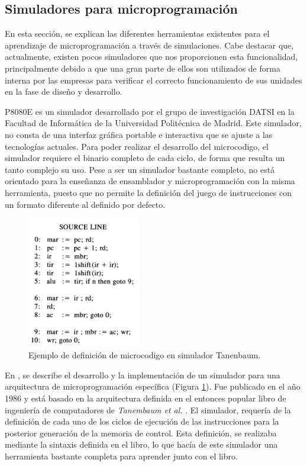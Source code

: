 \subsection{Simuladores para microprogramación}
\label{sec:simuladores_microprogramacion}

En esta sección, se explican las diferentes herramientas existentes para el aprendizaje de microprogramación a través de simulaciones. Cabe destacar que, actualmente, existen pocos simuladores que nos proporcionen esta funcionalidad, principalmente debido a que una gran parte de ellos son utilizados de forma interna por las empresas para verificar el correcto funcionamiento de sus unidades en la fase de diseño y desarrollo. 

P8080E \cite{p8080E} es un simulador desarrollado por el grupo de investigación DATSI en la Facultad de Informática de la Universidad Politécnica de Madrid. Este simulador, no consta de una interfaz gráfica portable e interactiva que se ajuste a las tecnologías actuales. Para poder realizar el desarrollo del \gls{microcodigo}, el simulador requiere el binario completo de cada ciclo, de forma que resulta un tanto complejo su uso. Pese a ser un simulador bastante completo, no está orientado para la enseñanza de \gls{ensamblador} y microprogramación con la misma herramienta, puesto que no permite la definición del juego de instrucciones con un formato diferente al definido por defecto.

\begin{figure}[htbp]
 	\centering
 	\includegraphics[width=5cm]{figures/ejemploTanenbaum}
 	\caption{Ejemplo de definición de \gls{microcodigo} en simulador Tanenbaum.}
	\label{fig:tanenbaum_figure}
\end{figure}

En \cite{yen1986development}, se describe el desarrollo y la implementación de un simulador para una arquitectura de microprogramación específica (Figura \ref{fig:tanenbaum_figure}). Fue publicado en el año 1986 y está basado en la arquitectura definida en el entonces popular libro de ingeniería de computadores de \textit{Tanembaum et al.} \cite{tanenbaum1984}. El simulador, requería de la definición de cada uno de los ciclos de ejecución de las instrucciones para la posterior generación de la memoria de control. Esta definición, se realizaba mediante la sintaxis definida en el libro, lo que hacía de este simulador una herramienta bastante completa para aprender junto con el libro. 


